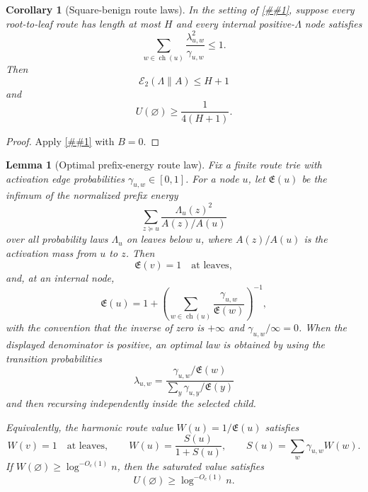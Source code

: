 \documentclass[10pt]{article}
\newcommand{\cref}[1]{\ref{##1}}
\newtheorem{lemma}[theorem]{Lemma}
\newtheorem{corollary}[theorem]{Corollary}
\theoremstyle{definition}
\begin{document}
\begin{corollary}[Square-benign route laws]\label{cor:square-benign-route-laws}
   In the setting of \cref{lem:local-prefix-energy}, suppose every
   root-to-leaf route has length at most $H$ and every internal
   positive-$\Lambda$ node satisfies
   \[
      \sum_{w\in\operatorname{ch}(u)}
      \frac{\lambda_{u,w}^2}{\gamma_{u,w}}\le1.
   \]
   Then
   \[
      \mathcal E_2(\Lambda\|A)\le H+1
   \]
   and
   \[
      U(\varnothing)\ge\frac{1}{4(H+1)}.
   \]
\end{corollary}

\begin{proof}
   Apply \cref{lem:prefix-energy-spine-toll} with $B=0$.
\end{proof}

\begin{lemma}[Optimal prefix-energy route law]\label{lem:optimal-prefix-energy-law}
   Fix a finite route trie with activation edge probabilities
   $\gamma_{u,w}\in[0,1]$. For a node $u$, let
   $\mathfrak E(u)$ be the infimum of the normalized prefix energy
   \[
      \sum_{z\succeq u}
      \frac{\Lambda_u(z)^2}{A(z)/A(u)}
   \]
   over all probability laws $\Lambda_u$ on leaves below $u$, where
   $A(z)/A(u)$ is the activation mass from $u$ to $z$. Then
   \[
      \mathfrak E(v)=1\quad\text{at leaves},
   \]
   and, at an internal node,
   \[
      \mathfrak E(u)
      =
      1+
      \left(
         \sum_{w\in\operatorname{ch}(u)}
         \frac{\gamma_{u,w}}{\mathfrak E(w)}
      \right)^{-1},
   \]
   with the convention that the inverse of zero is $+\infty$ and
   $\gamma_{u,w}/\infty=0$. When the displayed denominator is positive, an
   optimal law is obtained by using the transition probabilities
   \[
      \lambda_{u,w}
      =
      \frac{\gamma_{u,w}/\mathfrak E(w)}
           {\sum_y\gamma_{u,y}/\mathfrak E(y)}
   \]
   and then recursing independently inside the selected child.

   Equivalently, the harmonic route value
   $W(u)=1/\mathfrak E(u)$ satisfies
   \[
      W(v)=1\quad\text{at leaves},
      \qquad
      W(u)=\frac{S(u)}{1+S(u)},
      \qquad
      S(u)=\sum_w\gamma_{u,w}W(w).
   \]
   If $W(\varnothing)\ge\log^{-O_c(1)}n$, then the saturated value satisfies
   \[
      U(\varnothing)\ge\log^{-O_c(1)}n .
   \]
\end{lemma}
\end{document}
